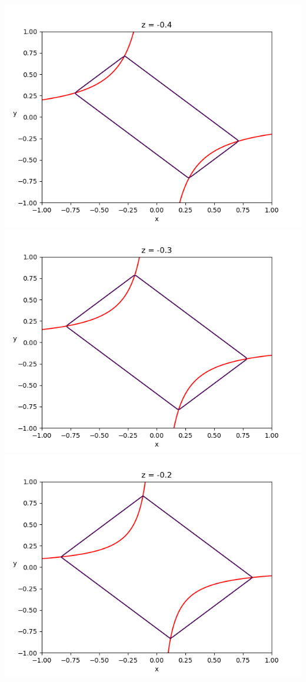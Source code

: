 \documentclass{article}
\begin{document}
\begin{enumerate}
	\begin{center}
		\includegraphics[scale=.3]{hw7 level curves z = -0.4}
		\includegraphics[scale=.3]{hw7 level curves z = -0.3}
		\includegraphics[scale=.3]{hw7 level curves z = -0.2}

\end{center}
\end{enumerate}
\end{document}
